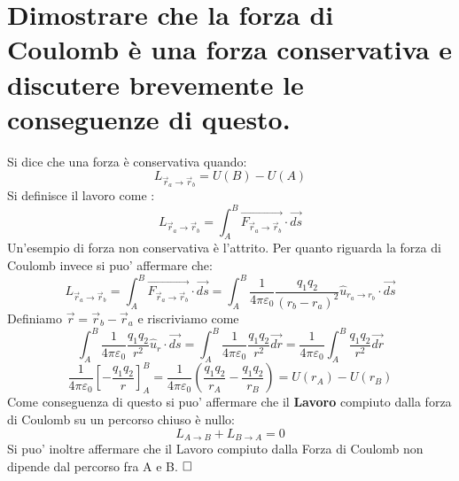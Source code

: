 \section{Dimostrare che la forza di Coulomb è una forza
	conservativa e discutere brevemente le conseguenze di
	questo.}
Si dice che una forza \`e conservativa quando:
$$
   L_{\vec{r}_a \rightarrow \vec{r}_b} = U(B) - U(A)
$$
Si definisce il lavoro come :
$$
   L_{\vec{r}_a \rightarrow \vec{r}_b} = 
   \int_A^B{\vec{F_{\vec{r}_a \rightarrow \vec{r}_b}} \cdot \vec{ds}}
$$
Un'esempio di forza non conservativa \`e l'attrito.
Per quanto riguarda la forza di Coulomb invece si puo' affermare che:
\begin{displaymath}
    L_{\vec{r}_a \rightarrow \vec{r}_b} =
    \int_A^B{\vec{F_{\vec{r}_a \rightarrow \vec{r}_b}} \cdot \vec{ds}} =
    \int_A^B{ 
    	\frac{ 1 } { 4 \pi \varepsilon_0 } 
    	\frac{ q_1 q_2 }{ (r_b - r_a)^2 } 
        \hat{u}_{r_a \rightarrow r_b} \cdot \vec{ ds }
        }
\end{displaymath}
Definiamo $\vec{r} = \vec{r}_b - \vec{r}_a$ e riscriviamo come
\begin{displaymath}
    \int_A^B{ 
    	\frac{ 1 } { 4 \pi \varepsilon_0 } 
    	\frac{ q_1 q_2 }{ r^2 } 
    	\hat{u}_r \cdot \vec{ ds }
    } = 
    \int_A^B{ 
    	\frac{ 1 } { 4 \pi \varepsilon_0 } 
    	\frac{ q_1 q_2 }{ r^2 } 
    	\vec{dr}
    } =  
  	\frac{ 1 } { 4 \pi \varepsilon_0 } 
    \int_A^B{ 
    	\frac{ q_1 q_2 }{ r^2 } 
    	\vec{dr}
    }
\end{displaymath}
\begin{displaymath}
\frac{ 1 }{ 4 \pi \varepsilon_0 }
\left[ 
-\frac{ q_1 q_2 }{r}
\right]_A^B = 
\frac{ 1 }{ 4 \pi \varepsilon_0 }
\left(
    \frac{ q_1 q_2 }{r_A} - \frac{ q_1 q_2 }{r_B}
\right) = 
U(r_A) - U(r_B)
\end{displaymath}
Come conseguenza di questo si puo' affermare che il \textbf{Lavoro} compiuto dalla forza di Coulomb su un percorso chiuso \`e nullo:
$$
    L_{A \rightarrow B} + L_{B \rightarrow A} = 0
$$
Si puo' inoltre affermare che il Lavoro compiuto dalla Forza di Coulomb non dipende dal percorso fra A e B.
$\hfill\square$